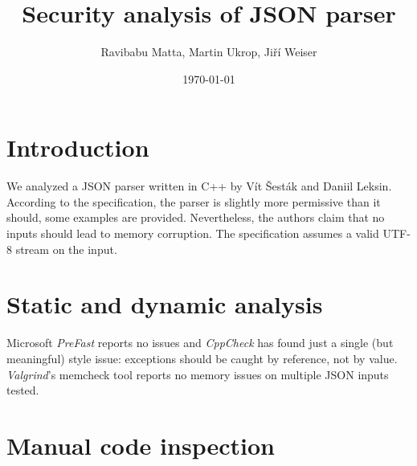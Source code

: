 \documentclass[11pt]{article}
\begin{document}
\title{Security analysis of JSON parser}
\date{\today}
\author{Ravibabu Matta, Martin Ukrop, Jiří Weiser}
\maketitle

\section{Introduction}

We analyzed a JSON parser written in C++ by Vít Šesták and Daniil Leksin. According to the specification, the parser is slightly more permissive than it should, some examples are provided. Nevertheless, the authors claim that no inputs should lead to memory corruption. The specification assumes a valid UTF-8 stream on the input.

\section{Static and dynamic analysis}

Microsoft \textit{PreFast} reports no issues and \textit{CppCheck} has found just a single (but meaningful) style issue: exceptions should be caught by reference, not by value. \textit{Valgrind}'s memcheck tool reports no memory issues on multiple JSON inputs tested.

\section{Manual code inspection}
\end{document}

